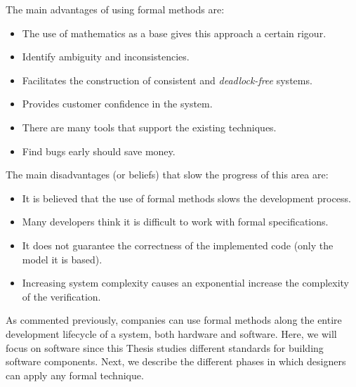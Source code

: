 The main advantages of using formal methods are:

\begin{itemize}
\item The use of mathematics as a base gives this approach a certain rigour.
\item Identify ambiguity and inconsistencies.
\item Facilitates the construction of consistent and \emph{deadlock-free} systems.
\item Provides customer confidence in the system.
\item There are many tools that support the existing techniques.
\item Find bugs early should save money.
\end{itemize} 

The main disadvantages (or beliefs) that slow the progress of this area are:

\begin{itemize}
\item It is believed that the use of formal methods slows the development process.
\item Many developers think it is difficult to work with formal specifications.
\item It does not guarantee the correctness of the implemented code (only the model
it is based).
\item Increasing system complexity causes an exponential increase
the complexity of the verification.
\end{itemize}

As commented previously, companies can use formal methods along the entire
development lifecycle of a system, both hardware and software. 
Here, we will focus on software since this Thesis studies different standards for building software components. 
Next, we describe the different phases in which designers can apply any formal technique. 

